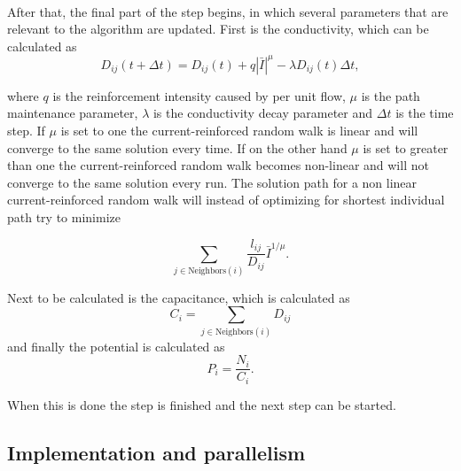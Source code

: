  \ \\
 
\noindent After that, the final part of the step begins, in which several parameters that are relevant to the algorithm are updated. First is the conductivity, which can be calculated as
\begin{equation}
D_{ij}(t + \Delta t) = D_{ij}(t) + q|\bar{I}|^\mu - \lambda D_{ij}(t)\Delta t,
\end{equation}

where $q$ is the reinforcement intensity caused by per unit flow, $\mu$ is the path maintenance parameter, $\lambda$ is the conductivity decay parameter and $\Delta t$ is the time step. If $\mu$ is set to one the current-reinforced random walk is linear and will converge to the same solution every time. If on the other hand $\mu$ is set to greater than one the current-reinforced random walk becomes non-linear and will not converge to the same solution every run. The solution path for a non linear current-reinforced random walk will instead of optimizing for shortest individual path try to minimize

\begin{equation}
\sum_{j \in \text{Neighbors}(i)}\frac{l_{ij}}{D_{ij}}\bar{I}^{1/\mu}.
\end{equation}
 

Next to be calculated is the capacitance, which is calculated as 
 \begin{equation}
 C_i = \sum_{j \in \text{Neighbors}(i)} D_{ij}
 \end{equation}
 and finally the potential is calculated as
 \begin{equation}
 P_i = \frac{N_i}{C_i}.
 \end{equation}
 
 \noindent When this is done the step is finished and the next step can be started.
 
 \subsection{Implementation and parallelism}